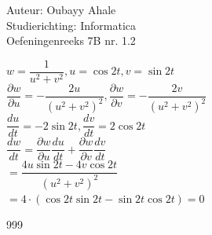 \documentclass[a4paper]{article}
\begin{document}
    
    \noindent \large Auteur: Oubayy Ahale       \\
    \noindent \large Studierichting: Informatica\\
    \noindent \large Oefeningenreeks 7B nr. 1.2 \\
    
    \medskip
    
    \normalsize

    $ w = \dfrac{1}{u^2 + v^2}, u = \cos2t, v = \sin2t $\\

    $ \dfrac{\partial w}{\partial u} = -\dfrac{2u}{(u^2 + v^2)^2}, \dfrac{\partial w}{\partial v} = -\dfrac{2v}{(u^2 + v^2)^2} $\\

    $ \dfrac{du}{dt} = -2\sin2t, \dfrac{dv}{dt} = 2 \cos2t$\\

    $ \dfrac{dw}{dt}= \dfrac{\partial w}{\partial u} \dfrac{du}{dt} + \dfrac{\partial w}{\partial v} \dfrac{dv}{dt} $\\

    $ = \dfrac{4u \sin2t - 4v \cos2t}{(u^2 + v^2)^2} $\\

    $ = 4 \cdot (\cos2t \sin2t - \sin2t \cos2t) = 0$\\

    \begin{thebibliography}{999}
    \end{thebibliography}
    
\end{document}
